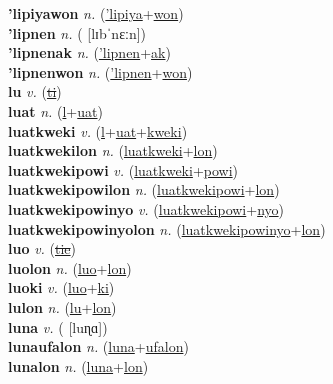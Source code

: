 \textbf{'lipiyawon} \textit{n.} (\hyperref['lipiya]{'lipiya}+\hyperref[won]{won})
 \label{'lipiyawon} \\
\textbf{'lipnen} \textit{n.} ( [lɪbˈnɛːn])
 \label{'lipnen} \\
\textbf{'lipnenak} \textit{n.} (\hyperref['lipnen]{'lipnen}+\hyperref[ak]{ak})
 \label{'lipnenak} \\
\textbf{'lipnenwon} \textit{n.} (\hyperref['lipnen]{'lipnen}+\hyperref[won]{won})
 \label{'lipnenwon} \\
\textbf{lu} \textit{v.} (\hyperref[ti]{\sout{ti}})
 \label{lu} \\
\textbf{luat} \textit{n.} (\hyperref[l]{l}+\hyperref[uat]{uat})
 \label{luat} \\
\textbf{luatkweki} \textit{v.} (\hyperref[l]{l}+\hyperref[uat]{uat}+\hyperref[kweki]{kweki})
 \label{luatkweki} \\
\textbf{luatkwekilon} \textit{n.} (\hyperref[luatkweki]{luatkweki}+\hyperref[lon]{lon})
 \label{luatkwekilon} \\
\textbf{luatkwekipowi} \textit{v.} (\hyperref[luatkweki]{luatkweki}+\hyperref[powi]{powi})
 \label{luatkwekipowi} \\
\textbf{luatkwekipowilon} \textit{n.} (\hyperref[luatkwekipowi]{luatkwekipowi}+\hyperref[lon]{lon})
 \label{luatkwekipowilon} \\
\textbf{luatkwekipowinyo} \textit{v.} (\hyperref[luatkwekipowi]{luatkwekipowi}+\hyperref[nyo]{nyo})
 \label{luatkwekipowinyo} \\
\textbf{luatkwekipowinyolon} \textit{n.} (\hyperref[luatkwekipowinyo]{luatkwekipowinyo}+\hyperref[lon]{lon})
 \label{luatkwekipowinyolon} \\
\textbf{luo} \textit{v.} (\hyperref[tie]{\sout{tie}})
 \label{luo} \\
\textbf{luolon} \textit{n.} (\hyperref[luo]{luo}+\hyperref[lon]{lon})
 \label{luolon} \\
\textbf{luoki} \textit{v.} (\hyperref[luo]{luo}+\hyperref[ki]{ki})
 \label{luoki} \\
\textbf{lulon} \textit{n.} (\hyperref[lu]{lu}+\hyperref[lon]{lon})
 \label{lulon} \\
\textbf{luna} \textit{v.} ( [luɳɑ])
 \label{luna} \\
\textbf{lunaufalon} \textit{n.} (\hyperref[luna]{luna}+\hyperref[ufalon]{ufalon})
 \label{lunaufalon} \\
\textbf{lunalon} \textit{n.} (\hyperref[luna]{luna}+\hyperref[lon]{lon})
 \label{lunalon} \\
